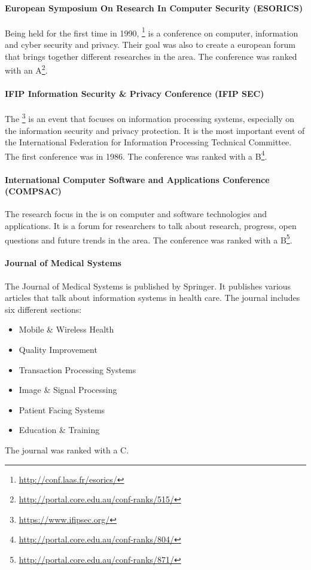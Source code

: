 \paragraph{European Symposium On Research In Computer Security (ESORICS)}
Being held for the first time in 1990, \footnote{\url{http://conf.laas.fr/esorics/}} is a conference on computer, information and cyber security and privacy. Their goal was also to create a european forum that brings together different researches in the area. The conference was ranked with an A\footnote{\url{http://portal.core.edu.au/conf-ranks/515/}}.
\paragraph{IFIP Information Security \& Privacy Conference (IFIP SEC)} The \footnote{\url{https://www.ifipsec.org/}} is an event that focuses on information processing systems, especially on the information security and privacy protection. It is the most important event of the International Federation for Information Processing Technical Committee. The first conference was in 1986. The conference was ranked with a B\footnote{\url{http://portal.core.edu.au/conf-ranks/804/}}.
\paragraph{International Computer Software and Applications Conference (COMPSAC)}
The research focus in the  is on computer and software technologies and applications. It is a forum for researchers to talk about research, progress, open questions and future trends in the area. The conference was ranked with a B\footnote{\url{http://portal.core.edu.au/conf-ranks/871/}}.
\paragraph{Journal of Medical Systems}
The Journal of Medical Systems is published by Springer. It publishes various articles that talk about information systems in health care. The journal includes six different sections:
\begin{itemize}[noitemsep]
	\item Mobile \& Wireless Health
	\item Quality Improvement
	\item Transaction Processing Systems
	\item Image \& Signal Processing
	\item Patient Facing Systems
	\item Education \& Training
\end{itemize}
The journal was ranked with a C.
